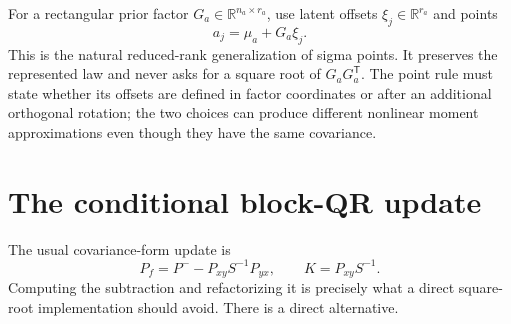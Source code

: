 \documentclass[11pt]{article}
\newcommand{\R}{\mathbb{R}}
\newcommand{\transpose}{^{\mathsf T}}
\begin{document}
For a rectangular prior factor $G_a\in\R^{n_a\times r_a}$, use latent offsets
$\xi_j\in\R^{r_a}$ and points
\begin{equation}
 a_j=\mu_a+G_a\xi_j.
 \label{eq:rectangular-sigma-points}
\end{equation}
This is the natural reduced-rank generalization of sigma points.  It preserves
the represented law and never asks for a square root of $G_aG_a\transpose$.
The point rule must state whether its offsets are defined in factor coordinates
or after an additional orthogonal rotation; the two choices can produce
different nonlinear moment approximations even though they have the same
covariance.

\section{The conditional block-QR update}
\label{sec:conditional}

The usual covariance-form update is
\begin{equation}
 P_f=P^- - P_{xy}S^{-1}P_{yx},\qquad K=P_{xy}S^{-1}.
 \label{eq:cov-update}
\end{equation}
Computing the subtraction and refactorizing it is precisely what a direct
square-root implementation should avoid.  There is a direct alternative.
\end{document}
